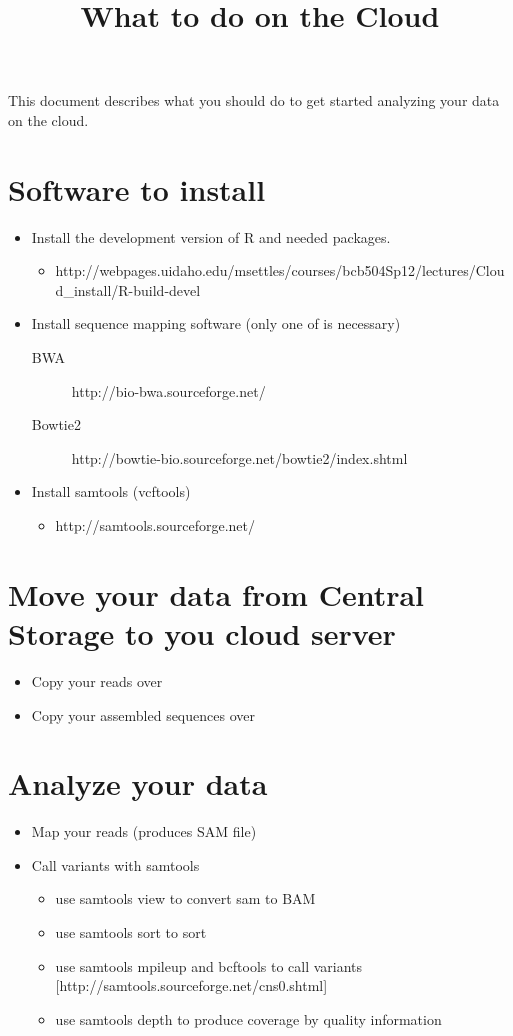 \documentclass{article}
\begin{document}
\title{What to do on the Cloud}

\maketitle

This document describes what you should do to get started analyzing your data on the cloud. 

\section{Software to install}

\begin{itemize}
  \item Install the development version of R and needed packages.
  \begin{itemize}
    \item http://webpages.uidaho.edu/msettles/courses/bcb504Sp12/lectures/Cloud\_install/R-build-devel 
  \end{itemize}
  \item Install sequence mapping software (only one of is necessary)
  \begin{description}
    \item[BWA] http://bio-bwa.sourceforge.net/
    \item[Bowtie2] http://bowtie-bio.sourceforge.net/bowtie2/index.shtml 
  \end{description}
  \item Install samtools (vcftools)
  \begin{itemize}
    \item http://samtools.sourceforge.net/
  \end{itemize}
\end{itemize}


\section{Move your data from Central Storage to you cloud server}
\begin{itemize}
  \item Copy your reads over
  \item Copy your assembled sequences over
\end{itemize}

\section{Analyze your data}
\begin{itemize}
  \item Map your reads  (produces SAM file)
  \item Call variants with samtools
  \begin{itemize}
    \item use samtools view to convert sam to BAM
    \item use samtools sort to sort
    \item use samtools mpileup and bcftools to call variants [http://samtools.sourceforge.net/cns0.shtml]
    \item use samtools depth to produce coverage by quality information 
  \end{itemize}
\end{itemize}
\end{document}
